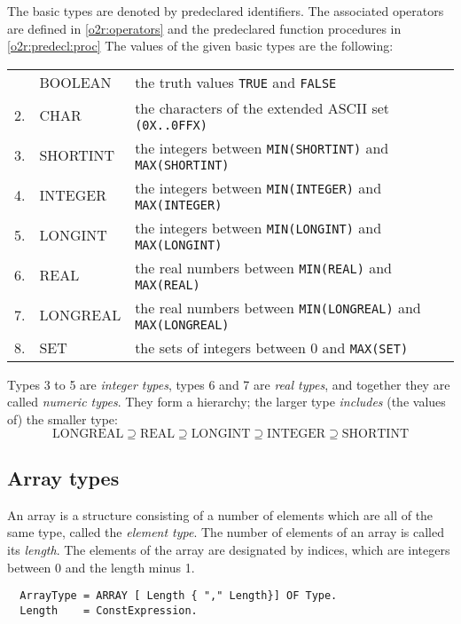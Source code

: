 The basic types are denoted by predeclared identifiers. The associated
operators are defined in \ref{o2r:operators} and the predeclared
function procedures in \ref{o2r:predecl:proc} The values
of the given basic types are the following:
\begin{flushleft}
\ifonline
\begin{tabular}{lll}
\else
\begin{tabular}{llp{7cm}}
\fi
1. & { BOOLEAN}  &   the truth values {\tt TRUE} and {\tt FALSE}               \\
2. & { CHAR}     &   the characters of the extended ASCII set
                                                     {\tt (0X..0FFX)}    \\
3. & { SHORTINT} &   the integers between {\tt MIN(SHORTINT)}
                                      and {\tt MAX(SHORTINT)}     \\
4. & { INTEGER}  &   the integers between {\tt MIN(INTEGER)}
                                                and {\tt MAX(INTEGER)}      \\
5. & { LONGINT}  &   the integers between {\tt MIN(LONGINT)}
                                                and {\tt MAX(LONGINT)}      \\
6. & { REAL}     &   the real numbers between {\tt MIN(REAL)}
                                                and {\tt MAX(REAL)}         \\
7. & { LONGREAL} &   the real numbers between {\tt MIN(LONGREAL)}
                                                and {\tt MAX(LONGREAL)}     \\
8. & { SET}      &   the sets of integers between 0 and {\tt MAX(SET)}   \\
\end{tabular}
\end{flushleft}
Types 3 to 5 are {\em integer types}, types 6 and 7 are {\em real
types}, and together they are called {\em numeric types}. They
form a hierarchy; the larger type {\em includes} (the values of)
the smaller type:
$$
\mbox{LONGREAL} \supseteq
\mbox{REAL} \supseteq
\mbox{LONGINT} \supseteq
\mbox{INTEGER} \supseteq
\mbox{SHORTINT}
$$

\subsection{Array types}

An array is a structure consisting of a number of elements which are
all of the same type, called the {\em element type}. The number of
elements of an array is called its {\em length}. The elements of
the array are designated by indices, which are integers between 0
and the length minus 1.
{\BNFsize
\begin{verbatim}
  ArrayType = ARRAY [ Length { "," Length}] OF Type.
  Length    = ConstExpression.
\end{verbatim}}


